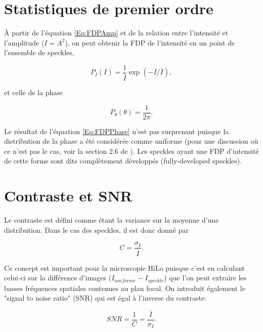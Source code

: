 \documentclass{article}       %
\begin{document}
\bigskip

\section{Statistiques de premier ordre}
\label{Sec:PremierOrdre}

À partir de l'équation \ref{Eq:FDPAmp} et de la relation entre l'intensité et l'amplitude ($I=A^2$), on peut obtenir la FDP de l'intensité en un point de l'ensemble de speckles,

\begin{equation}
\label{Eq:FDPInt}
    P_{I}(I) = \frac{1}{\overline{I}}\exp(-I/\overline{I}),
\end{equation}

et celle de la phase

\begin{equation}
\label{Eq:FDPPhase}
    P_{\theta}(\theta) = \frac{1}{2\pi}.
\end{equation}

Le résultat de l'équation \ref{Eq:FDPPhase} n'est pas surprenant puisque la distribution de la phase a été considérée comme uniforme (pour une discussion où ce n'est pas le cas, voir la section 2.6 de \cite{Manuel}). Les speckles ayant une FDP d'intensité de cette forme sont dits complètement développés (fully-developed speckles).\\

\bigskip


\section{Contraste et SNR}

Le contraste est défini comme étant la variance sur la moyenne d'une distribution. Dans le cas des speckles, il est donc donné par

\begin{equation*}
    C = \frac{\sigma_I}{\overline{I}}.
\end{equation*}

Ce concept est important pour la microscopie HiLo puisque c'est en calculant celui-ci sur la différence d'images ($I_{uniforme}-I_{speckle}$) que l'on peut extraire les basses fréquences spatiales contenues au plan focal. On introduit également le "signal to noise ratio" (SNR) qui est égal à l'inverse du contraste:

\begin{equation*}
    SNR = \frac{1}{C} = \frac{\overline{I}}{\sigma_I}.
\end{equation*}
\end{document}
